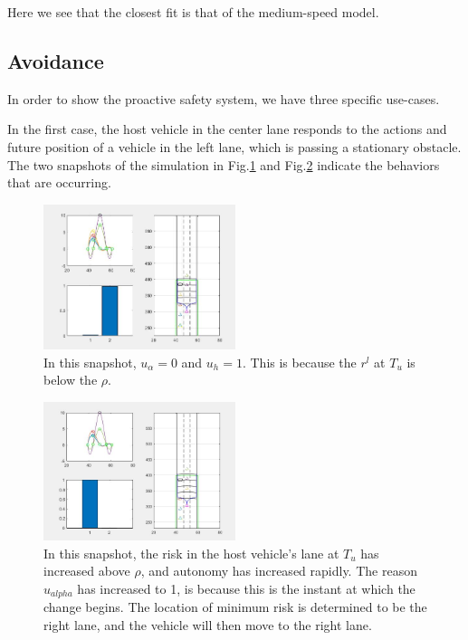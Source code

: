 \documentclass[conference]{IEEEtran}
\begin{document}
Here we see that the closest fit is that of the medium-speed model.
 
 
\subsection{Avoidance}
In order to show the proactive safety system, we have three specific use-cases.

In the first case, the host vehicle in the center lane responds to the actions and future position of a vehicle in the left lane, which is passing a stationary obstacle. The two snapshots of the simulation in Fig.\ref{fig:cs1} and Fig.\ref{fig:cs1b} indicate the behaviors that are occurring.

\begin{figure}[ht]
    \includegraphics[width=0.5\textwidth]{cs1.JPG}
    \caption{In this snapshot, $u_{\alpha} = 0$ and $u_{h} = 1$. This is because the $r^l$ at $T_u$ is below the $\rho$.}
    \label{fig:cs1}
\end{figure}

\begin{figure}[ht]
    \includegraphics[width=0.5\textwidth]{cs1b.JPG}
    \caption{In this snapshot, the risk in the host vehicle's lane at $T_u$ has increased above $\rho$, and autonomy has increased rapidly. The reason $u_{alpha}$ has increased to 1, is because this is the instant at which the change begins. The location of minimum risk is determined to be the right lane, and the vehicle will then move to the right lane.}
    \label{fig:cs1b}
\end{figure}
\end{document}
